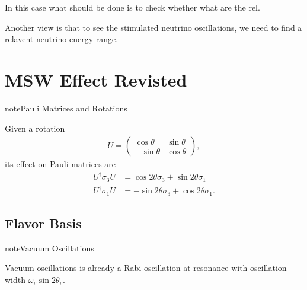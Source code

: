 \documentclass[letterpaper,12pt,english]{sphinxmanual}
\begin{document}
In this case what should be done is to check whether what are the rel.

Another view is that to see the stimulated neutrino oscillations, we need to find a relavent neutrino energy range.


\section{MSW Effect Revisted}
\label{\detokenize{matter-stimulated/msw-revisted::doc}}\label{\detokenize{matter-stimulated/msw-revisted:msw-effect-revisted}}
\begin{sphinxadmonition}{note}{Pauli Matrices and Rotations}

Given a rotation
\begin{equation*}
\begin{split}U = \begin{pmatrix} \cos \theta & \sin \theta \\ -\sin\theta & \cos \theta \end{pmatrix},\end{split}
\end{equation*}
its effect on Pauli matrices are
\begin{equation*}
\begin{split}U^\dagger \sigma_3 U  &=\cos 2\theta \sigma_3 + \sin 2\theta \sigma_1 \\
U^\dagger \sigma_1 U & = -\sin 2\theta \sigma_3 + \cos 2\theta \sigma_1.\end{split}
\end{equation*}\end{sphinxadmonition}


\subsection{Flavor Basis}
\label{\detokenize{matter-stimulated/msw-revisted:flavor-basis}}
\begin{sphinxadmonition}{note}{Vacuum Oscillations}

Vacuum oscillations is already a Rabi oscillation at resonance with oscillation width \(\omega_v \sin 2\theta_v\).
\end{sphinxadmonition}
\end{document}
